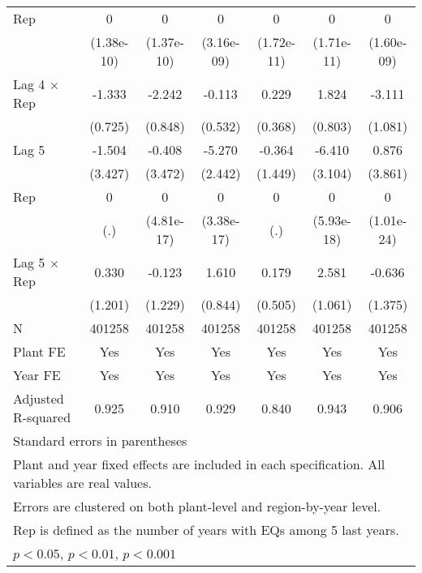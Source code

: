 \begin{table}[htbp]
\begin{tabular}{l*{6}{c}}
\addlinespace
Rep             &        0         &        0         &        0         &        0         &        0         &        0         \\
                &(1.38e-10)         &(1.37e-10)         &(3.16e-09)         &(1.72e-11)         &(1.71e-11)         &(1.60e-09)         \\
\addlinespace
Lag 4 $\times$ Rep&   -1.333         &   -2.242\sym{**} &   -0.113         &    0.229         &    1.824\sym{*}  &   -3.111\sym{**} \\
                &  (0.725)         &  (0.848)         &  (0.532)         &  (0.368)         &  (0.803)         &  (1.081)         \\
\addlinespace
Lag 5           &   -1.504         &   -0.408         &   -5.270\sym{*}  &   -0.364         &   -6.410\sym{*}  &    0.876         \\
                &  (3.427)         &  (3.472)         &  (2.442)         &  (1.449)         &  (3.104)         &  (3.861)         \\
\addlinespace
Rep             &        0         &        0         &        0         &        0         &        0         &        0         \\
                &      (.)         &(4.81e-17)         &(3.38e-17)         &      (.)         &(5.93e-18)         &(1.01e-24)         \\
\addlinespace
Lag 5 $\times$ Rep&    0.330         &   -0.123         &    1.610         &    0.179         &    2.581\sym{*}  &   -0.636         \\
                &  (1.201)         &  (1.229)         &  (0.844)         &  (0.505)         &  (1.061)         &  (1.375)         \\
\midrule
N               &   401258         &   401258         &   401258         &   401258         &   401258         &   401258         \\
Plant FE        &      Yes         &      Yes         &      Yes         &      Yes         &      Yes         &      Yes         \\
Year FE         &      Yes         &      Yes         &      Yes         &      Yes         &      Yes         &      Yes         \\
Adjusted R-squared&    0.925         &    0.910         &    0.929         &    0.840         &    0.943         &    0.906         \\
\bottomrule
\multicolumn{7}{l}{\footnotesize Standard errors in parentheses}\\
\multicolumn{7}{l}{\footnotesize Plant and year fixed effects are included in each specification. All variables are real values.}\\
\multicolumn{7}{l}{\footnotesize Errors are clustered on both plant-level and region-by-year level.}\\
\multicolumn{7}{l}{\footnotesize Rep is defined as the number of years with EQs among 5 last years.}\\
\multicolumn{7}{l}{\footnotesize \sym{*} \(p<0.05\), \sym{**} \(p<0.01\), \sym{***} \(p<0.001\)}\\
\end{tabular}
\end{table}
